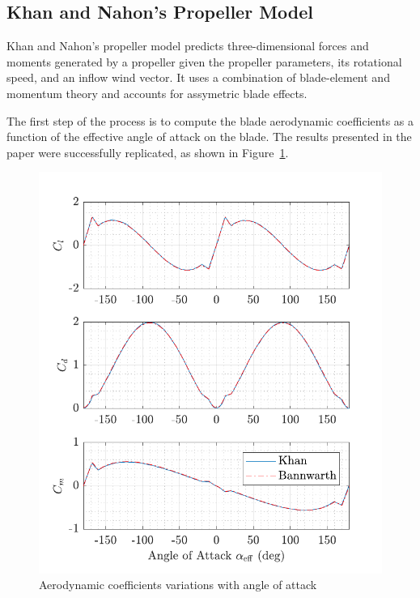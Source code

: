 \documentclass[a4paper,12pt]{article}
\begin{document}
        \subsection{Khan and Nahon's Propeller Model}

            Khan and Nahon's propeller model predicts three-dimensional forces and moments generated by a propeller given the propeller parameters, its rotational speed, and an inflow wind vector. It uses a combination of blade-element and momentum theory and accounts for assymetric blade effects.

            The first step of the process is to compute the blade aerodynamic coefficients as a function of the effective angle of attack on the blade. The results presented in the paper were successfully replicated, as shown in Figure~\ref{fig:aero_coefs}.

            \begin{figure}[h!]
                \centering%
                \includegraphics{aero_coefs.pdf}%
                \caption{Aerodynamic coefficients variations with angle of attack}\label{fig:aero_coefs}
            \end{figure}
\end{document}
